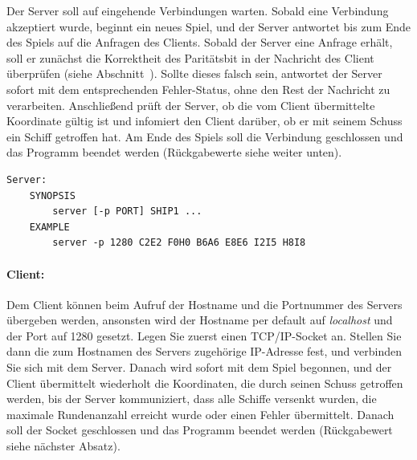 Der Server soll auf eingehende Verbindungen warten. Sobald eine Verbindung
akzeptiert wurde, beginnt ein neues Spiel, und der Server antwortet bis zum
Ende des Spiels auf die Anfragen des Clients.
Sobald der Server eine Anfrage erhält, soll er zunächst die Korrektheit des Paritätsbit in der Nachricht des Client
überprüfen (siehe Abschnitt~).
Sollte dieses falsch sein, antwortet der Server sofort mit dem entsprechenden Fehler-Status,
ohne den Rest der Nachricht zu verarbeiten.
Anschließend prüft der Server, ob die vom Client übermittelte Koordinate gültig ist
und infomiert den Client darüber, ob er mit seinem Schuss ein Schiff getroffen hat.
Am Ende des Spiels soll die Verbindung geschlossen und das Programm beendet werden
(Rückgabewerte siehe weiter unten).



\begin{verbatim}
Server:
    SYNOPSIS
        server [-p PORT] SHIP1 ...
    EXAMPLE
        server -p 1280 C2E2 F0H0 B6A6 E8E6 I2I5 H8I8
\end{verbatim}

\paragraph{Client:}

Dem Client können beim Aufruf der Hostname und die Portnummer des Servers
übergeben werden, ansonsten wird der Hostname per default auf \emph{localhost}
und der Port auf 1280 gesetzt. Legen Sie zuerst einen
TCP/IP-Socket an. Stellen Sie dann die zum Hostnamen des Servers zugehörige
IP-Adresse fest, und verbinden Sie sich mit dem Server. Danach wird sofort mit
dem Spiel begonnen, und der Client übermittelt wiederholt die Koordinaten,
die durch seinen Schuss getroffen werden, bis der Server kommuniziert,
dass alle Schiffe versenkt wurden, die maximale Rundenanzahl erreicht wurde
oder einen Fehler übermittelt.
Danach soll der Socket geschlossen und das
Programm beendet werden (Rückgabewert siehe nächster Absatz).

